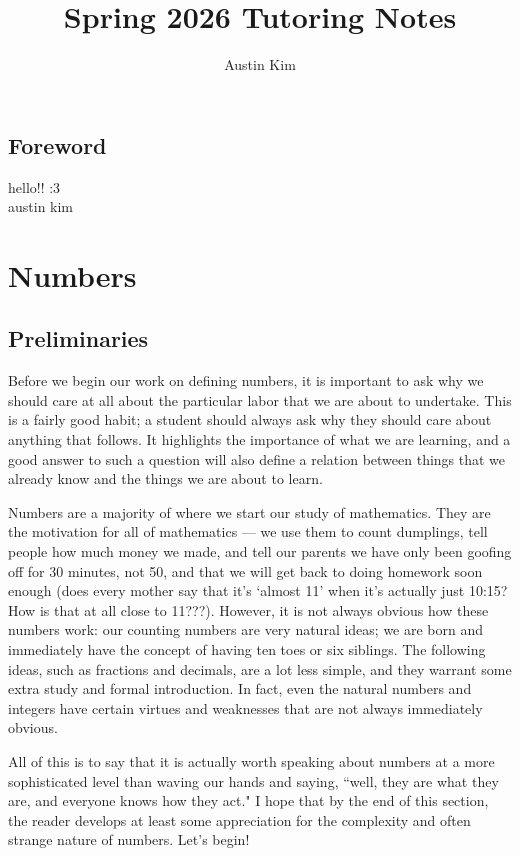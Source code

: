 \documentclass[openany]{book}
\title{Spring 2026 Tutoring Notes}
\author{Austin Kim}
\begin{document}
\maketitle

\setlength{\headsep}{0.5cm}
\section*{Foreword}
\normalsize \indent hello!! :3 \vspace{0.6cm}\\
austin kim

\tableofcontents
\chapter{Numbers}
\section{Preliminaries}
Before we begin our work on defining numbers, it is important to ask why we should care at all about the particular labor that we are about to undertake. This is a fairly good habit; a student should always ask why they should care about anything that follows. It highlights the importance of what we are learning, and a good answer to such a question will also define a relation between things that we already know and the things we are about to learn.\par
Numbers are a majority of where we start our study of mathematics. They are the motivation for all of mathematics --- we use them to count dumplings, tell people how much money we made, and tell our parents we have only been goofing off for 30 minutes, not 50, and that we will get back to doing homework soon enough (does every mother say that it's `almost 11' when it's actually just 10:15? How is that at all close to 11???). However, it is not always obvious how these numbers work: our counting numbers are very natural ideas; we are born and immediately have the concept of having ten toes or six siblings. The following ideas, such as fractions and decimals, are a lot less simple, and they warrant some extra study and formal introduction. In fact, even the natural numbers and integers have certain virtues and weaknesses that are not always immediately obvious.\par
All of this is to say that it is actually worth speaking about numbers at a more sophisticated level than waving our hands and saying, ``well, they are what they are, and everyone knows how they act." I hope that by the end of this section, the reader develops at least some appreciation for the complexity and often strange nature of numbers. Let's begin!
\end{document}
